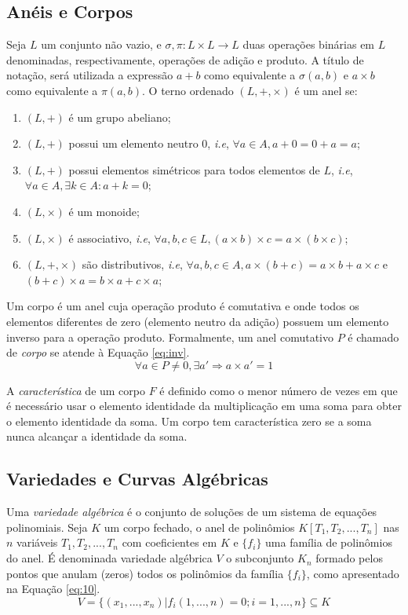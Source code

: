 \subsection{Anéis e Corpos}
 Seja \(L\) um conjunto não vazio, e \(\sigma, \pi:L \times L \to L\) duas operações binárias em \(L\) denominadas, respectivamente, operações de adição e produto. A título de notação, será utilizada a expressão \(a+b\) como equivalente a \(\sigma(a,b)\) e \(a \times b\) como equivalente a \(\pi(a,b)\). O terno ordenado \((L, +,\times )\) é um anel se:
\begin{enumerate}
  \item \((L, +)\) é um grupo abeliano;
  \item \((L, +)\) possui um elemento neutro $0$, \textit{i.e}, \(\forall a \in A, a + 0 = 0 + a = a\);
  \item \((L, +)\) possui elementos simétricos para todos elementos de $L$, \textit{i.e}, \(\forall a \in A, \exists k \in A: a + k = 0\);
  \item \((L, \times)\) é um monoide;
  \item \((L, \times)\) é associativo, \textit{i.e}, \(\forall a,b,c \in L, (a \times b) \times c = a \times (b \times c)\);
  \item \((L, +, \times)\) são distributivos, \textit{i.e}, \(\forall a,b,c \in A, a \times (b + c) = a \times b + a \times c\) e \((b + c) \times a = b \times a + c \times a\);
\end{enumerate}

Um corpo é um anel cuja operação produto é comutativa e onde todos os elementos diferentes de zero (elemento neutro da adição) possuem um elemento inverso para a operação produto. Formalmente, um anel comutativo \(P\) é chamado de \textit{corpo} se atende à Equação \ref{eq:inv}.
\begin{equation}
  \forall a \in P \neq {0}, \exists a' \Rightarrow a \times a' = 1
    \label{eq:inv}
\end{equation}

A \textit{característica} de um corpo \(F\) é definido como o menor número de vezes em que é necessário usar o elemento identidade da multiplicação em uma soma para obter o elemento identidade da soma. Um corpo tem característica zero se a soma nunca alcançar a identidade da soma.

%
% 
\subsection{Variedades e Curvas Algébricas}
Uma \textit{variedade algébrica} é o conjunto de soluções de um sistema de equações polinomiais. Seja \(K\) um corpo fechado, o anel de polinômios \(K[T_1 , T_2, ..., T_n ]\) nas \(n\) variáveis \(T_1 , T_2 , ..., T_n \) com coeficientes em \(K\) e \(\{f_{i}\}\) uma família de polinômios do anel. É denominada variedade algébrica \(V\) o subconjunto \(K_n\) formado pelos pontos que anulam (zeros) todos os polinômios da família \(\{f_{i}\}\), como apresentado na Equação \ref{eq:10}.
\begin{equation}
V = \{(x_1 , ..., x_n ) | f_{i}(1, ..., n) = 0; i = 1, ..., n\} \subseteq K \label{eq:10}
\end{equation}

